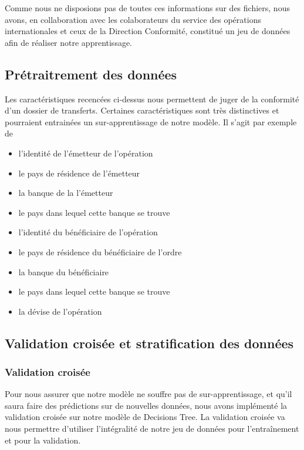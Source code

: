 Comme nous ne disposions pas de toutes ces informations sur des fichiers, nous
avons, en collaboration avec les colaborateurs du service des opérations
internationales et ceux de la Direction Conformité, constitué un jeu de données
afin de réaliser notre apprentissage.


\subsection{Prétraitrement des données}

Les caractéristiques recencées ci-dessus nous permettent de juger de la 
conformité d'un dossier de transferts. Certaines caractéristiques sont très
distinctives et pourraient entrainées un sur-apprentissage de notre modèle.
Il s'agit par exemple de 
\begin{itemize}
  \item l'identité de l'émetteur de l'opération
  \item le pays de résidence de l'émetteur 
  \item la banque de la l'émetteur
  \item le pays dans lequel cette banque se trouve
  \item l'identité du bénéficiaire de l'opération
  \item le pays de résidence du bénéficiaire de l'ordre
  \item la banque du bénéficiaire
  \item le pays dans lequel cette banque se trouve
  \item la dévise de l'opération
\end{itemize}


    \subsection{Validation croisée et stratification des données}

    \subsubsection{Validation croisée}
      Pour nous assurer que notre modèle ne souffre pas de sur-apprentissage, et
      qu’il saura faire des prédictions sur de nouvelles données, nous avons
      implémenté la validation croisée sur notre modèle de Decisions Tree. La 
      validation croisée va nous permettre d’utiliser l'intégralité de notre jeu
      de données pour l’entraînement et pour la validation.

